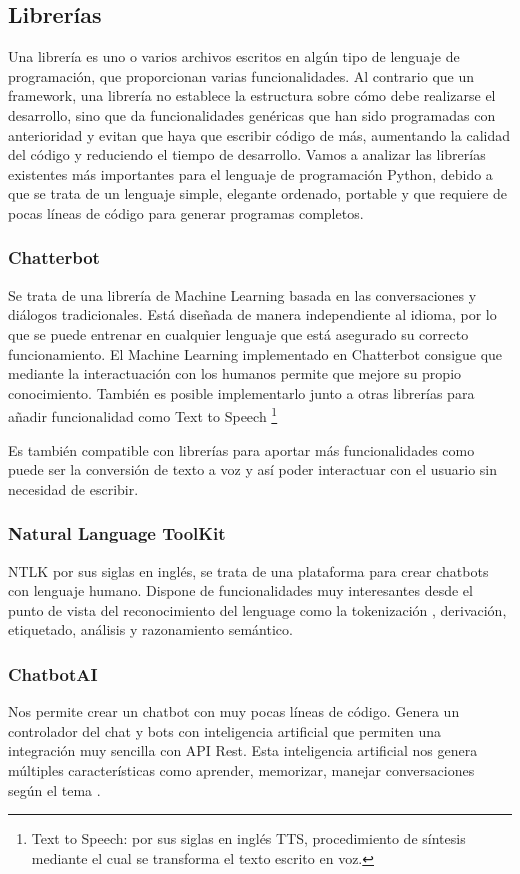 \subsection{Librerías}

Una librería es uno o varios archivos escritos en algún tipo de lenguaje de programación, que proporcionan varias funcionalidades. Al contrario que un framework, una librería no establece la estructura sobre cómo debe realizarse el desarrollo, sino que da funcionalidades genéricas que han sido programadas con anterioridad y evitan que haya que escribir código de más, aumentando la calidad del código y reduciendo el tiempo de desarrollo.
Vamos a analizar las librerías existentes más importantes para el lenguaje de programación Python, debido a que se trata de un lenguaje simple, elegante ordenado, portable y que requiere de pocas líneas de código para generar programas completos.

\subsubsection{Chatterbot}
Se trata de una librería de Machine Learning basada en las conversaciones y diálogos tradicionales. Está diseñada de manera independiente al idioma, por lo que se puede entrenar en cualquier lenguaje que está asegurado su correcto funcionamiento. 
El Machine Learning implementado en Chatterbot consigue que mediante la interactuación con los humanos permite que mejore su propio conocimiento. También es posible implementarlo junto a otras librerías para añadir funcionalidad como Text to Speech \footnote{Text to Speech: por sus siglas en inglés TTS, procedimiento de síntesis mediante el cual se transforma el texto escrito en voz.}

Es también compatible con librerías para aportar más funcionalidades como puede ser la conversión de texto a voz y así poder interactuar con el usuario sin necesidad de escribir.

\subsubsection{Natural Language ToolKit} NTLK por sus siglas en inglés, se trata de una plataforma para crear chatbots con lenguaje humano. Dispone de funcionalidades muy interesantes desde el punto de vista del reconocimiento del lenguage como la tokenización , derivación, etiquetado, análisis y razonamiento semántico.

\subsubsection{ChatbotAI} Nos permite crear un chatbot con muy pocas líneas de código. Genera un controlador del chat y bots con inteligencia artificial que permiten una integración muy sencilla con API Rest. Esta inteligencia artificial nos genera múltiples características como aprender, memorizar, manejar conversaciones según el tema \cite{chatbotAI}. 

